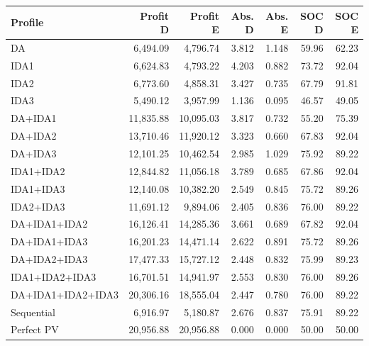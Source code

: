 \begingroup\small
\begin{longtable}{lrrrrrr}
\toprule
Profile & Profit D & Profit E & Abs. D & Abs. E & SOC D & SOC E\\
\midrule\endhead
DA & 6,494.09 & 4,796.74 & 3.812 & 1.148 & 59.96 & 62.23\\
IDA1 & 6,624.83 & 4,793.22 & 4.203 & 0.882 & 73.72 & 92.04\\
IDA2 & 6,773.60 & 4,858.31 & 3.427 & 0.735 & 67.79 & 91.81\\
IDA3 & 5,490.12 & 3,957.99 & 1.136 & 0.095 & 46.57 & 49.05\\
DA+IDA1 & 11,835.88 & 10,095.03 & 3.817 & 0.732 & 55.20 & 75.39\\
DA+IDA2 & 13,710.46 & 11,920.12 & 3.323 & 0.660 & 67.83 & 92.04\\
DA+IDA3 & 12,101.25 & 10,462.54 & 2.985 & 1.029 & 75.92 & 89.22\\
IDA1+IDA2 & 12,844.82 & 11,056.18 & 3.789 & 0.685 & 67.86 & 92.04\\
IDA1+IDA3 & 12,140.08 & 10,382.20 & 2.549 & 0.845 & 75.72 & 89.26\\
IDA2+IDA3 & 11,691.12 & 9,894.06 & 2.405 & 0.836 & 76.00 & 89.22\\
DA+IDA1+IDA2 & 16,126.41 & 14,285.36 & 3.661 & 0.689 & 67.82 & 92.04\\
DA+IDA1+IDA3 & 16,201.23 & 14,471.14 & 2.622 & 0.891 & 75.72 & 89.26\\
DA+IDA2+IDA3 & 17,477.33 & 15,727.12 & 2.448 & 0.832 & 75.99 & 89.23\\
IDA1+IDA2+IDA3 & 16,701.51 & 14,941.97 & 2.553 & 0.830 & 76.00 & 89.26\\
DA+IDA1+IDA2+IDA3 & 20,306.16 & 18,555.04 & 2.447 & 0.780 & 76.00 & 89.22\\
Sequential & 6,916.97 & 5,180.87 & 2.676 & 0.837 & 75.91 & 89.22\\
Perfect PV & 20,956.88 & 20,956.88 & 0.000 & 0.000 & 50.00 & 50.00\\
\bottomrule
\end{longtable}
\endgroup
